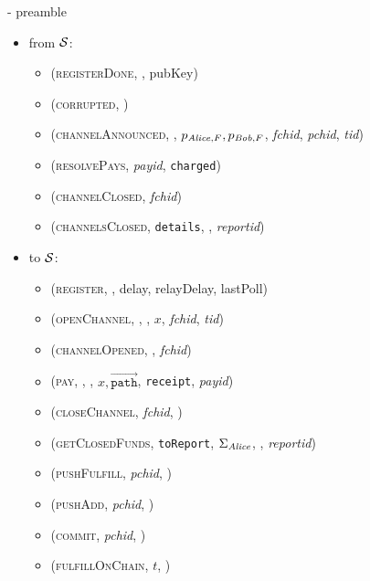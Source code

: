 \begin{figure}[H]
\begin{systembox}{\fpaynet - preamble}
\begin{itemize}
\begin{itemize}
        \end{itemize}
        \item from $\mathcal{S}$:
        \begin{itemize}
          \item (\textsc{registerDone}, \alice, pubKey)
          \item (\textsc{corrupted}, \alice)
          \item (\textsc{channelAnnounced}, \alice, $p_{\mathit{Alice}, F}, p_{\mathit{Bob},
          F}$, \textit{fchid}, \textit{pchid}, \textit{tid})
          \item (\textsc{resolvePays}, \textit{payid}, \texttt{charged})
          \item (\textsc{channelClosed}, \textit{fchid})
          \item (\textsc{channelsClosed}, \texttt{details}, \alice,
          \textit{reportid})
        \end{itemize}
        \item to $\mathcal{S}$:
        \begin{itemize}
          \item (\textsc{register}, \alice, delay, relayDelay, lastPoll)
          \item (\textsc{openChannel}, \alice, \bob, $x$, \textit{fchid},
          \textit{tid})
          \item (\textsc{channelOpened}, \alice, \textit{fchid})
          \item (\textsc{pay}, \alice, \bob, $x,
          \overrightarrow{\mathtt{path}}$, \texttt{receipt}, \textit{payid})
          \item (\textsc{closeChannel}, \textit{fchid}, \alice)
          \item (\textsc{getClosedFunds}, \texttt{toReport}, $\Sigma_{\mathit{Alice}}$,
          \alice, \textit{reportid})
          \item (\textsc{pushFulfill}, \textit{pchid}, \alice)
          \item (\textsc{pushAdd}, \textit{pchid}, \alice)
          \item (\textsc{commit}, \textit{pchid}, \alice)
          \item (\textsc{fulfillOnChain}, $t$, \alice)
        \end{itemize}
      \end{itemize}
    \end{systembox}
    \caption{}
    \label{alg:fpaynet:interface}
  \end{figure}

